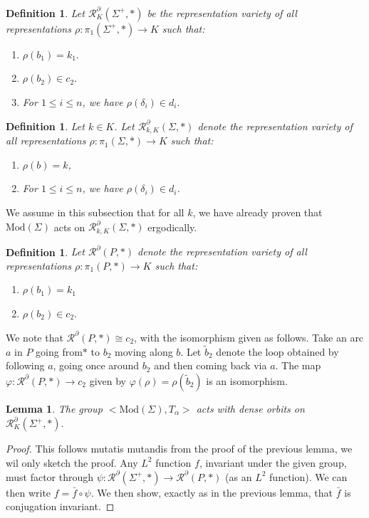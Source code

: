 \documentclass{article}
\newcommand{\Rc}{\mathcal{R}}
\newcommand{\Mod}{\textrm{Mod}}
\newtheorem{definition}[theorem]{Definition}
\newtheorem{lemma}{Lemma}[theorem]
\begin{document}
    \begin{definition}
        Let $\Rc^{\partial}_K (\Sigma^+,*)$ be the representation variety of all representations $\rho: \pi_1(\Sigma^+, *) \to K$ such that:
    \begin{enumerate}
    \item $\rho(b_1) =k_1.$
    \item  $\rho(b_2) \in c_2$. 
    \item For $1\le i \le n$, we have $\rho(\delta_i) \in d_i.$
    \end{enumerate}

    \end{definition}
   \begin{definition}
           Let $k \in K$. Let $\Rc_{k,K}^{\partial} (\Sigma, *)$ denote the representation variety of all representations $\rho: \pi_1 (\Sigma,*) \to K$ such that: 
    \begin{enumerate}
        \item $\rho(b) =k$,
        \item For $1\le i \le n$, we have $\rho(\delta_i) \in d_i$.
    \end{enumerate}
   \end{definition}

    We assume in this subsection that for all $k$, we have already proven that $\Mod(\Sigma)$ acts on $\Rc_{k,K}^{\partial}(\Sigma, *)$ ergodically.
\begin{definition}
        Let $\Rc^{\partial}(P, *)$ denote the representation variety of all representations $\rho: \pi_1(P, *) \to K$ such that:
    \begin{enumerate}
        \item  $\rho(b_1) = k_1$
        \item $\rho (b_2) \in c_2.$
    \end{enumerate}
\end{definition}
 We note that $\Rc^ \partial(P, *) \cong c_2$, with the isomorphism
     given as follows. Take an arc $a$ in $P$ going from$*$ to $b_2$  moving along $b$. Let $\tilde b_2$ denote the loop obtained by following $a$, going once around $b_2$ and then coming back via $a$. The map $\varphi: \Rc^ \partial(P, *) \to  c_2 $ given by $\varphi(\rho) = \rho (\tilde b_2)$ is an isomorphism.

\begin{lemma}\label{indsamebound}
The group $<\Mod(\Sigma), T_{\alpha}>$ acts with dense orbits on $\Rc^{\partial}_K(\Sigma^+, *).$
\end{lemma}
\begin{proof}
    This follows mutatis mutandis from the proof of the previous lemma, we wil only sketch the proof. Any  $L^2$ function $f$, invariant under the given group, must factor through $\psi : \Rc^{\partial}(\Sigma^+ , *) \to \Rc^{\partial}(P, *)$ (as an $L^2$ function). We can then write $f = \bar f \circ \psi$. We then show, exactly as in the previous lemma, that $\bar f$ is conjugation invariant.
\end{proof}
 
\end{document}
